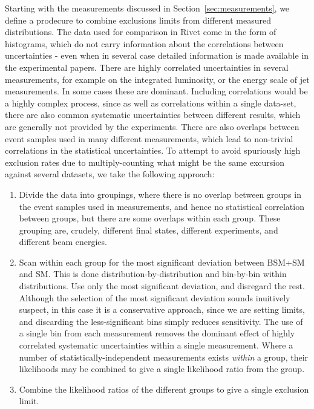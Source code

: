 \documentclass[floatfix]{article}
\begin{document}
Starting with the measurements discussed in Section~\ref{sec:measurements}, we define a prodecure to combine exclusions limits from different measured distributions.
The data used for comparison in Rivet come in the form of histograms, which do not carry information about the correlations between uncertainties - 
even when in several case detailed information is made available in the experimental papers. There are highly correlated uncertainties in several measurements, 
for example on the integrated luminosity, or the energy scale of jet measurements. In some cases these are dominant. Including correlations would be a highly 
complex process, since as well as correlations within a single data-set, there are also common systematic uncertainties between different
results, which are generally not provided by the experiments. There are also overlaps between event samples used in many different measurements, which lead to
non-trivial correlations in the statistical uncertainties. To attempt to avoid spuriously high exclusion rates due to multiply-counting what might be the 
same excursion against several datasets, we take the following approach:
\begin{enumerate}
\item Divide the data into groupings, where there is no overlap between groups in the event samples used in measurements, and hence no statistical correlation 
between groups, but there are some overlaps within each group. These grouping are, crudely, different final states, different experiments, and different beam 
energies.
\item Scan within each group for the most significant deviation between BSM+SM and SM. This is done distribution-by-distribution and bin-by-bin within distributions.
Use only the most significant deviation, and disregard the rest. Although the selection of the most significant deviation sounds inuitively suspect, in this case it
is a conservative approach, since we are setting limits, and discarding the less-significant bins simply reduces sensitivity. 
The use of a single bin from each measurement removes the dominant effect of highly correlated 
systematic uncertainties within a single measurement. Where a number
of statistically-independent measurements exists {\it within} a group, their likelihoods may be combined to give a single likelihood ratio from the group.
\item Combine the likelihood ratios of the different groups to give a single exclusion limit.
\end{enumerate}
\end{document}
